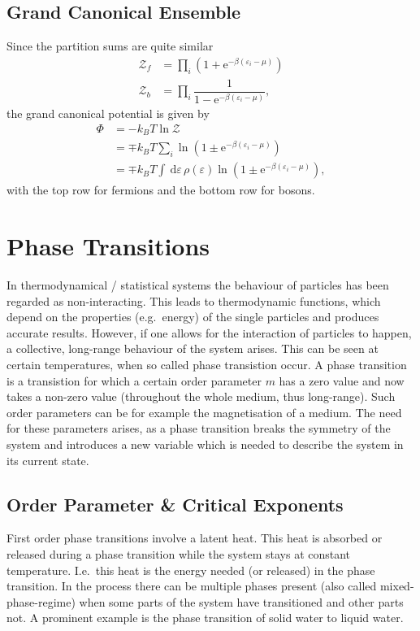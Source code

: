 \documentclass[a4paper,10pt]{article}
\newcommand{\td}{\,\text{d}}
\numberwithin{equation}{section}
\begin{document}
\begin{multicols}{2}
\subsection{Grand Canonical Ensemble}
Since the partition sums are quite similar
\begin{align} 
  \mathcal{Z}_f &= \prod_{i}^{}\left(1+\text{e}^{-\beta (\varepsilon _i-\mu )}\right)\\
  \mathcal{Z}_b &= \prod_{i}^{}\dfrac{1}{1-\text{e}^{-\beta (\varepsilon _i-\mu )}}
,\end{align} 
the grand canonical potential is given by
\begin{align} 
  \Phi  &= -k_BT\ln\mathcal{Z} \\
        &= \mp k_BT\sum_{i}^{}\ln \left(1\pm\text{e}^{-\beta (\varepsilon _i-\mu )}\right)\\
        &= \mp k_BT\int_{}^{}\td \varepsilon \,\rho (\varepsilon )\ln \left(1\pm\text{e}^{-\beta (\varepsilon _i-\mu )}\right)
,\end{align} 
with the top row for fermions and the bottom row for bosons.


\section{Phase Transitions}
In thermodynamical / statistical systems the behaviour of particles has been regarded as non-interacting.
This leads to thermodynamic functions, which depend on the properties (e.g.\ energy) of the single particles and produces accurate results.
However, if one allows for the interaction of particles to happen, a collective, long-range behaviour of the system arises.
This can be seen at certain temperatures, when so called phase transistion occur.
A phase transition is a transistion for which a certain order parameter $m$ has a zero value and now takes a non-zero value (throughout the whole medium, thus long-range).
Such order parameters can be for example the magnetisation of a medium.
The need for these parameters arises, as a phase transition breaks the symmetry of the system and introduces a new variable which is needed to describe the system in its current state.

\subsection{Order Parameter \& Critical Exponents}
First order phase transitions involve a latent heat.
This heat is absorbed or released during a phase transition while the system stays at constant temperature.
I.e.\ this heat is the energy needed (or released) in the phase transition.
In the process there can be multiple phases present (also called mixed-phase-regime) when some parts of the system have transitioned and other parts not.
A prominent example is the phase transition of solid water to liquid water.


\end{multicols}
\end{document}
